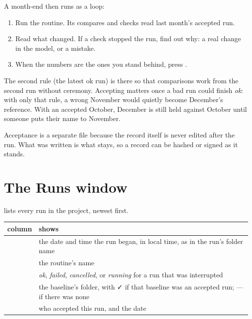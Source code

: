 A month-end then runs as a loop:

\begin{enumerate}
\item Run the routine. Its compares and  checks read last month's accepted run.
\item Read what changed. If a check stopped the run, find out why: a real change in the model, or a mistake.
\item When the numbers are the ones you stand behind, press .
\end{enumerate}

\begin{why}
The second rule (the latest ok run) is there so that comparisons work from the second run without ceremony. Accepting matters once a bad run could finish \emph{ok}: with only that rule, a wrong November would quietly become December's reference. With an accepted October, December is still held against October until someone puts their name to November.

Acceptance is a separate file because the record itself is never edited after the run. What was written is what stays, so a record can be hashed or signed as it stands.
\end{why}

\section{The Runs window}\label{sec:checks-runs}
 lists every run in the project, newest first.


\begin{tabularx}{\linewidth}{@{}lL@{}}\toprule
column & shows \\ \midrule
{} & the date and time the run began, in local time, as in the run's folder name \\
 & the routine's name \\
 & \emph{ok}, \emph{failed}, \emph{cancelled}, or \emph{running} for a run that was interrupted \\
 & the baseline's folder, with ✓ if that baseline was an accepted run; — if there was none \\
 & who accepted this run, and the date \\
\bottomrule
\end{tabularx}

